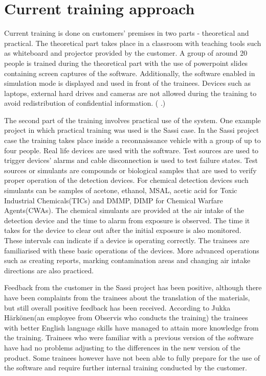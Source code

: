 \documentclass[12pt, a4paper,oneside, nocenter]{thesis}
\newcommand{\citeyeartitlexamk}[1]{(\usebibentry{#1}{title} \citeyear{#1}.)}
\begin{document}
\section{Current training approach}
Current training is done on customers' premises in two parts - theoretical and practical. The theoretical part takes place in a classroom with teaching tools such as whiteboard and projector provided by the customer. A group of around 20 people is trained during the theoretical part with the use of powerpoint slides containing screen captures of the software. Additionally, the software enabled in simulation mode is displayed and used in front of the trainees. Devices such as laptops, external hard drives and cameras are not allowed during the training to avoid redistribution of confidential information. \citeyeartitlexamk{obsas-training-docs}
\par
The second part of the training involves practical use of the system. One example project in which practical training was used is the Sassi case. In the Sassi project case the training takes place inside a reconnaissance vehicle with a group of up to four people. Real life devices are used with the software. Test sources are used to trigger devices' alarms and cable disconnection is used to test failure states.
 Test sources or simulants are compounds or biological samples that are used to verify proper operation of the detection devices. For chemical detection devices such simulants can be samples of acetone, ethanol, MSAL, acetic acid for Toxic Industrial Chemicals(TICs) and DMMP, DIMP for Chemical Warfare Agents(CWAs). The chemical simulants are provided at the air intake of the detection device and the time to alarm from exposure is observed. The time it takes for the device to clear out after the initial exposure is also monitored. These intervals can indicate if a device is operating correctly. The trainees are familiarised with these basic operations of the devices. More advanced operations such as creating reports, marking contamination areas and changing air intake directions are also practiced.
\par%
Feedback from the customer in the Sassi project has been positive, although there have been complaints from the trainees about the translation of the materials, but still overall positive feedback has been received. According to Jukka Härkönen(an employee from Observis who conducts the training) the trainees with better English language skills have managed to attain more knowledge from the training. Trainees who were familiar with a previous version of the software have had no problems adjusting to the differences in the new version of the product. Some trainees however have not been able to fully prepare for the use of the software and require further internal training conducted by the customer.
\end{document}
